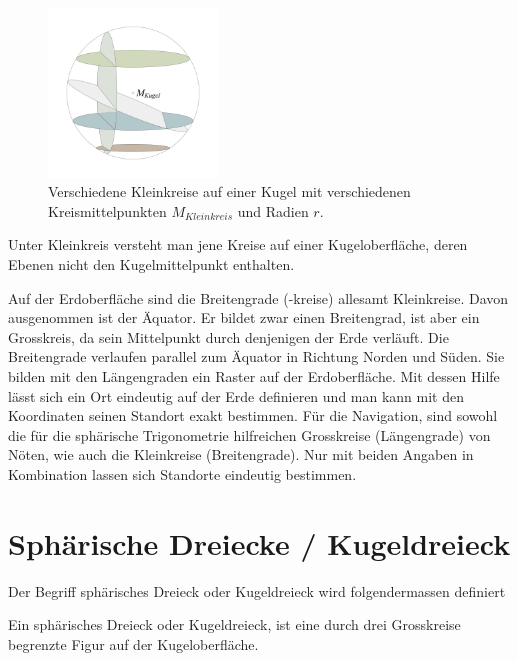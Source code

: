 \begin{refsection}
\begin{figure}[hbtp]
\centering
\includegraphics[width=0.4\textwidth]{kugel/Kleinkreise.jpg}
\caption{Verschiedene Kleinkreise auf einer Kugel mit verschiedenen Kreismittelpunkten $M_{Kleinkreis}$ und Radien $r$.}
\end{figure}

\begin{definition}
Unter Kleinkreis versteht man jene Kreise auf einer Kugeloberfläche, deren Ebenen nicht den Kugelmittelpunkt enthalten.
\label{skript:kugel:satz:Kleinkreis}
\end{definition} 

Auf der Erdoberfläche sind die Breitengrade (-kreise) allesamt Kleinkreise. Davon ausgenommen ist der Äquator. Er bildet zwar einen Breitengrad, ist aber ein Grosskreis, da sein Mittelpunkt durch denjenigen der Erde verläuft.
Die Breitengrade verlaufen parallel zum Äquator in Richtung Norden und Süden. Sie bilden mit den Längengraden ein Raster auf der Erdoberfläche. Mit dessen Hilfe lässt sich ein Ort eindeutig auf der Erde definieren und man kann mit den Koordinaten seinen Standort exakt bestimmen.
Für die Navigation, sind sowohl die für die sphärische Trigonometrie hilfreichen Grosskreise (Längengrade) von Nöten, wie auch die Kleinkreise (Breitengrade). Nur mit beiden Angaben in Kombination lassen sich Standorte eindeutig bestimmen.



\section{Sphärische Dreiecke / Kugeldreieck}
Der Begriff sphärisches Dreieck oder Kugeldreieck wird folgendermassen definiert

\begin{definition}
Ein sphärisches Dreieck oder Kugeldreieck, ist eine durch drei Grosskreise begrenzte Figur auf der Kugeloberfläche.
\end{definition} 


\end{refsection}
